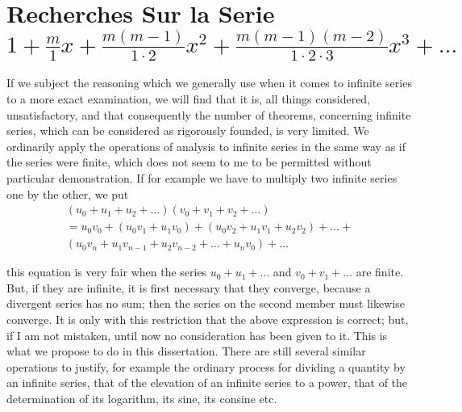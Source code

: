 \section{Recherches Sur la Serie $1 + \frac{m}{1}x + \frac{m(m-1)}{1\cdot2}x^2 + \frac{m(m-1)(m-2)}{1\cdot 2 \cdot 3}x^3 + \ldots$}


If we subject the reasoning which we generally use when it comes to infinite series
to a more exact examination, we will find that it is, all things considered, unsatisfactory,
and that consequently the number of theorems, concerning infinite series, which can be
considered as rigorously founded, is very limited.
We ordinarily apply the operations of analysis to infinite series in the same way as if the
series were finite, which does not seem to me to be permitted without particular
demonstration.
If for example we have to multiply two infinite series one by the other, we put
\begin{align*}
\left( u_0 + u_1 + u_2 + \ldots \right) \left( v_0 + v_1 + v_2 + \ldots \right) \\
= u_0 v_0 + (u_0 v_1 + u_1 v_0) + ( u_0 v_2 + u_1 v_1 + u_2 v_2 ) + \ldots + \\
    (u_0 v_n + u_1 v_{n-1} + u_2 v_{n-2} + \ldots + u_n v_0 ) + \ldots
\end{align*}

this equation is very fair when the series $u_0 + u_1 + \ldots$ and $v_0 + v_1 + \ldots$ are finite.
But, if they are infinite, it is first necessary that they converge, because a divergent series has no sum;
then the series on the second member must likewise converge.
It is only with this restriction that the above expression is correct;
but, if I am not mistaken, until now no consideration has been given to it.
This is what we propose to do in this dissertation.
There are still several similar operations to justify, for example the ordinary process
for dividing a quantity by an infinite series,
that of the elevation of an infinite series to a power, that of the determination of its logarithm,
its sine, its consine etc.